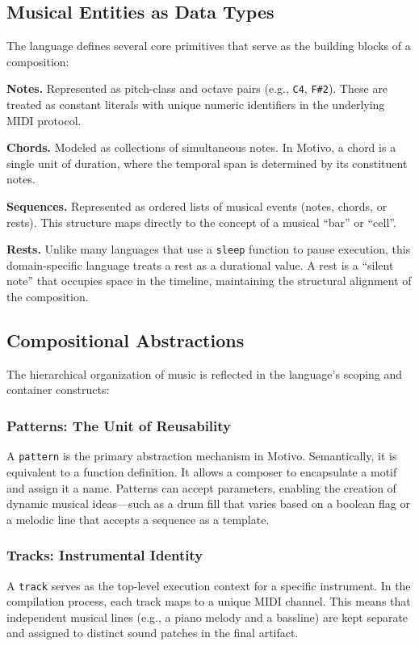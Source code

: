 \subsection{Musical Entities as Data Types}\label{detail-subsec:musical-entities-as-data-types}

The language defines several core primitives that serve as the building blocks of a composition:

\noindent \textbf{Notes.} Represented as pitch-class and octave pairs (e.g., \texttt{C4}, \texttt{F\#2}).
These are treated as constant literals with unique numeric identifiers in the underlying MIDI protocol.

\noindent \textbf{Chords.} Modeled as collections of simultaneous notes.
In Motivo, a chord is a single unit of duration, where the temporal span is determined by its constituent notes.

\noindent \textbf{Sequences.} Represented as ordered lists of musical events (notes, chords, or rests).
This structure maps directly to the concept of a musical ``bar'' or ``cell''.

\noindent \textbf{Rests.} Unlike many languages that use a \texttt{sleep} function to pause execution, this
domain-specific language treats a
rest as a durational value.
A rest is a ``silent note'' that occupies space in the timeline, maintaining the structural alignment of the
composition.

\subsection{Compositional Abstractions}\label{detail-subsec:compositional-abstractions}

The hierarchical organization of music is reflected in the language's scoping and container constructs:

\subsubsection{Patterns: The Unit of Reusability}
A \texttt{pattern} is the primary abstraction mechanism in Motivo\@.
Semantically, it is equivalent to a function definition.
It allows a composer to encapsulate a motif and assign it a name.
Patterns can accept parameters, enabling the creation of dynamic musical ideas---such as a drum fill that
varies based on
a boolean flag or a melodic line that accepts a sequence as a template.

\subsubsection{Tracks: Instrumental Identity}
A \texttt{track} serves as the top-level execution context for a specific instrument.
In the compilation process, each track maps to a unique MIDI channel.
This means that independent musical lines (e.g., a piano melody and a bassline) are kept separate and assigned to
distinct sound patches in the final artifact.


